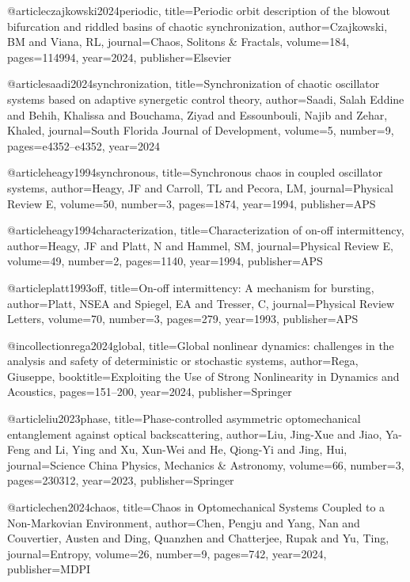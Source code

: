 @article{czajkowski2024periodic,
  title={Periodic orbit description of the blowout bifurcation and riddled basins of chaotic synchronization},
  author={Czajkowski, BM and Viana, RL},
  journal={Chaos, Solitons \& Fractals},
  volume={184},
  pages={114994},
  year={2024},
  publisher={Elsevier}
}

@article{saadi2024synchronization,
  title={Synchronization of chaotic oscillator systems based on adaptive synergetic control theory},
  author={Saadi, Salah Eddine and Behih, Khalissa and Bouchama, Ziyad and Essounbouli, Najib and Zehar, Khaled},
  journal={South Florida Journal of Development},
  volume={5},
  number={9},
  pages={e4352--e4352},
  year={2024}
}





@article{heagy1994synchronous,
  title={Synchronous chaos in coupled oscillator systems},
  author={Heagy, JF and Carroll, TL and Pecora, LM},
  journal={Physical Review E},
  volume={50},
  number={3},
  pages={1874},
  year={1994},
  publisher={APS}
}

@article{heagy1994characterization,
  title={Characterization of on-off intermittency},
  author={Heagy, JF and Platt, N and Hammel, SM},
  journal={Physical Review E},
  volume={49},
  number={2},
  pages={1140},
  year={1994},
  publisher={APS}
}


@article{platt1993off,
  title={On-off intermittency: A mechanism for bursting},
  author={Platt, NSEA and Spiegel, EA and Tresser, C},
  journal={Physical Review Letters},
  volume={70},
  number={3},
  pages={279},
  year={1993},
  publisher={APS}
}



@incollection{rega2024global,
  title={Global nonlinear dynamics: challenges in the analysis and safety of deterministic or stochastic systems},
  author={Rega, Giuseppe},
  booktitle={Exploiting the Use of Strong Nonlinearity in Dynamics and Acoustics},
  pages={151--200},
  year={2024},
  publisher={Springer}
}


@article{liu2023phase,
  title={Phase-controlled asymmetric optomechanical entanglement against optical backscattering},
  author={Liu, Jing-Xue and Jiao, Ya-Feng and Li, Ying and Xu, Xun-Wei and He, Qiong-Yi and Jing, Hui},
  journal={Science China Physics, Mechanics \& Astronomy},
  volume={66},
  number={3},
  pages={230312},
  year={2023},
  publisher={Springer}
}


@article{chen2024chaos,
  title={Chaos in Optomechanical Systems Coupled to a Non-Markovian Environment},
  author={Chen, Pengju and Yang, Nan and Couvertier, Austen and Ding, Quanzhen and Chatterjee, Rupak and Yu, Ting},
  journal={Entropy},
  volume={26},
  number={9},
  pages={742},
  year={2024},
  publisher={MDPI}
}

